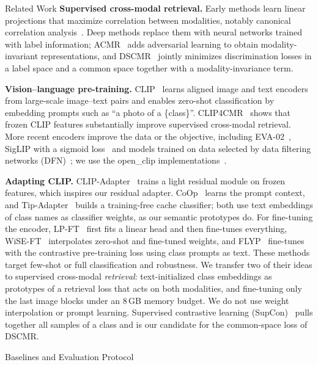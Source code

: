\documentclass[conference]{IEEEtran}
\makeatletter
\def\section{\@startsection{section}{1}{\z@}{2.2ex plus 1ex minus .5ex}{1ex plus .3ex}%
  {\normalfont\fontsize{12}{14}\selectfont\bfseries\scshape\centering}}
\makeatother
\begin{document}
\section{Related Work}
\textbf{Supervised cross-modal retrieval.} Early methods learn linear projections that maximize correlation between modalities, notably canonical correlation analysis~\cite{cca}. Deep methods replace them with neural networks trained with label information; ACMR~\cite{acmr} adds adversarial learning to obtain modality-invariant representations, and DSCMR~\cite{dscmr} jointly minimizes discrimination losses in a label space and a common space together with a modality-invariance term.

\textbf{Vision--language pre-training.} CLIP~\cite{clip} learns aligned image and text encoders from large-scale image--text pairs and enables zero-shot classification by embedding prompts such as ``a photo of a \{class\}''. CLIP4CMR~\cite{clip4cmr} shows that frozen CLIP features substantially improve supervised cross-modal retrieval. More recent encoders improve the data or the objective, including EVA-02~\cite{eva02}, SigLIP with a sigmoid loss~\cite{siglip} and models trained on data selected by data filtering networks (DFN)~\cite{dfn}; we use the open\_clip implementations~\cite{openclip}.

\textbf{Adapting CLIP.} CLIP-Adapter~\cite{clipadapter} trains a light residual module on frozen features, which inspires our residual adapter. CoOp~\cite{coop} learns the prompt context, and Tip-Adapter~\cite{tipadapter} builds a training-free cache classifier; both use text embeddings of class names as classifier weights, as our semantic prototypes do. For fine-tuning the encoder, LP-FT~\cite{lpft} first fits a linear head and then fine-tunes everything, WiSE-FT~\cite{wiseft} interpolates zero-shot and fine-tuned weights, and FLYP~\cite{flyp} fine-tunes with the contrastive pre-training loss using class prompts as text. These methods target few-shot or full classification and robustness. We transfer two of their ideas to supervised cross-modal \emph{retrieval}: text-initialized class embeddings as prototypes of a retrieval loss that acts on both modalities, and fine-tuning only the last image blocks under an 8\,GB memory budget. We do not use weight interpolation or prompt learning. Supervised contrastive learning (SupCon)~\cite{supcon} pulls together all samples of a class and is our candidate for the common-space loss of DSCMR.

\section{Baselines and Evaluation Protocol}
\end{document}
